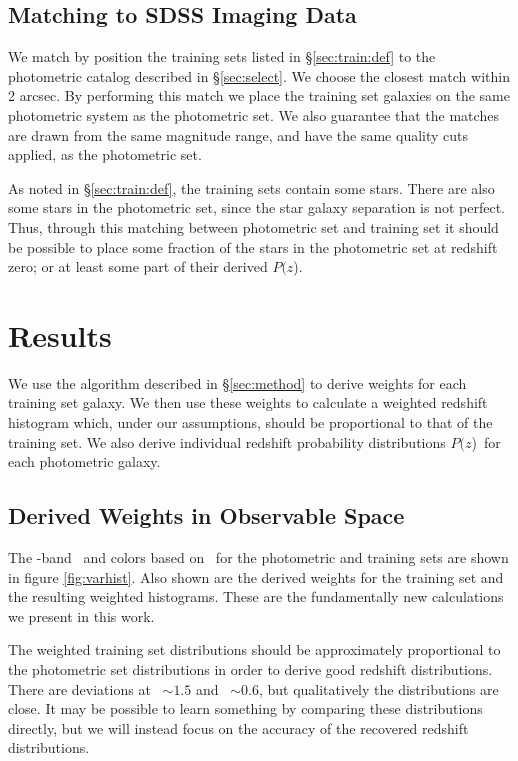 \documentclass[preprint]{aastex}
\newcommand{\pofz}{$P(z$)}
\newcommand{\matchrad}{2 arcsec}
\begin{document}
\subsection{Matching to SDSS Imaging Data} \label{sec:train:match}

We match by position the training sets listed in \S \ref{sec:train:def} to the
photometric catalog described in \S \ref{sec:select}.  We choose the closest
match within \matchrad.  By performing this match we place the training set
galaxies on the same photometric system as the photometric set.  We also
guarantee that the matches are drawn from the same magnitude range, and
have the same quality cuts applied, as the photometric set.

As noted in \S \ref{sec:train:def}, the training sets contain some stars.
There are also some stars in the photometric set, since the star galaxy
separation is not perfect.  Thus, through this matching between photometric set
and training set it should be possible to place some fraction of the stars in
the photometric set at redshift zero; or at least some part of their derived
\pofz.

\section{Results} \label{sec:results}

We use the algorithm described in \S \ref{sec:method} to derive weights for
each training set galaxy.  We then use these weights to calculate a weighted
redshift histogram which, under our assumptions, should be proportional to that
of the training set.  We also derive individual redshift probability
distributions \pofz\ for each photometric galaxy.

\subsection{Derived Weights in Observable Space}

The \rmag-band \cmodelmag\ and colors based on \modelmag\ for the photometric
and training sets are shown in figure \ref{fig:varhist}.  Also shown are the
derived weights for the training set and the resulting weighted histograms.
These are the fundamentally new calculations we present in this work.

The weighted training set distributions should be approximately proportional to
the photometric set distributions in order to derive good redshift
distributions.  There are deviations at \gmr\ $\sim 1.5$ and \rmi\ $\sim 0.6$,
but qualitatively the distributions are close.  It may be possible to learn
something by comparing these distributions directly, but we will instead focus
on the accuracy of the recovered redshift distributions.
\end{document}
